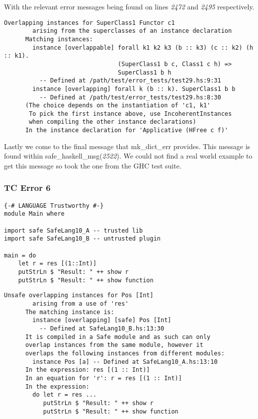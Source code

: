 \documentclass[a4paper]{article}
\begin{document}
With the relevant error messages being found on lines \textit{2472} and \textit{2495} respectively. 

\begin{lstlisting}[label={lst: T19.0.2}, numbers=none, caption={Error}]
Overlapping instances for SuperClass1 Functor c1
        arising from the superclasses of an instance declaration
      Matching instances:
        instance [overlappable] forall k1 k2 k3 (b :: k3) (c :: k2) (h :: k1).
                                (SuperClass1 b c, Class1 c h) =>
                                SuperClass1 b h
          -- Defined at /path/test/error_tests/test29.hs:9:31
        instance [overlapping] forall k (b :: k). SuperClass1 b b
          -- Defined at /path/test/error_tests/test29.hs:8:30
      (The choice depends on the instantiation of 'c1, k1'
       To pick the first instance above, use IncoherentInstances
       when compiling the other instance declarations)
      In the instance declaration for 'Applicative (HFree c f)'
\end{lstlisting}

Lastly we come to the final message that mk\_dict\_err provides. This message is found within safe\_haskell\_msg(\textit{2522}). We could not find a real world example to get this message so took the one from the GHC test suite.


\subsubsection{TC Error 6}

\begin{lstlisting}[label={lst: T20.0}, numbers=none, caption={Example Program \cite{ex20}}]
{-# LANGUAGE Trustworthy #-}
module Main where

import safe SafeLang10_A -- trusted lib
import safe SafeLang10_B -- untrusted plugin

main = do
    let r = res [(1::Int)]
    putStrLn $ "Result: " ++ show r 
    putStrLn $ "Result: " ++ show function
\end{lstlisting}

\begin{lstlisting}[label={lst: T20.0.2}, numbers=none, caption={Error}]
      Unsafe overlapping instances for Pos [Int]
        arising from a use of 'res'
      The matching instance is:
        instance [overlapping] [safe] Pos [Int]
          -- Defined at SafeLang10_B.hs:13:30
      It is compiled in a Safe module and as such can only
      overlap instances from the same module, however it
      overlaps the following instances from different modules:
        instance Pos [a] -- Defined at SafeLang10_A.hs:13:10
      In the expression: res [(1 :: Int)]
      In an equation for 'r': r = res [(1 :: Int)]
      In the expression:
        do let r = res ...
           putStrLn $ "Result: " ++ show r
           putStrLn $ "Result: " ++ show function
\end{lstlisting}
\end{document}
